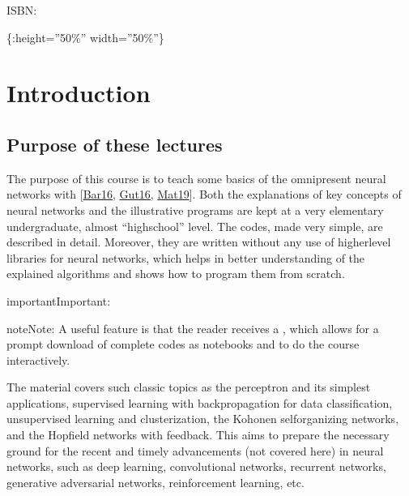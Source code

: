 \documentclass[letterpaper,10pt,english]{jupyterBook}
\begin{document}
\sphinxAtStartPar
ISBN: 

\sphinxAtStartPar
{}\{:height=”50\%” width=”50\%”\}




\chapter{Introduction}
\label{\detokenize{docs/intro:introduction}}\label{\detokenize{docs/intro::doc}}

\section{Purpose of these lectures}
\label{\detokenize{docs/intro:purpose-of-these-lectures}}
\sphinxAtStartPar
The purpose of this course is to teach some basics of the omnipresent neural networks with  {[}\hyperlink{cite.docs/conclusion:id5}{Bar16}, \hyperlink{cite.docs/conclusion:id3}{Gut16}, \hyperlink{cite.docs/conclusion:id2}{Mat19}{]}. Both the explanations of key concepts of neural networks and the illustrative programs are kept at a very elementary undergraduate, almost “high\sphinxhyphen{}school” level. The codes, made very simple, are described in detail. Moreover, they are written without any use of higher\sphinxhyphen{}level libraries for neural networks, which helps in better understanding of the explained algorithms and shows how to program them from scratch.

\begin{sphinxadmonition}{important}{Important:}
\sphinxAtStartPar
{}
\end{sphinxadmonition}

\begin{sphinxadmonition}{note}{Note:}
\sphinxAtStartPar
A useful feature is that the reader receives a , which allows for
a prompt download of complete codes as
 notebooks and to do the course interactively.
\end{sphinxadmonition}

\sphinxAtStartPar
The material covers such classic topics as the perceptron and its simplest applications, supervised learning with back\sphinxhyphen{}propagation for data classification, unsupervised learning and clusterization, the Kohonen self\sphinxhyphen{}organizing networks, and the Hopfield networks with feedback. This aims to prepare the necessary ground for the recent and timely advancements (not covered here) in neural networks, such as deep learning, convolutional networks, recurrent networks, generative adversarial networks, reinforcement learning, etc.
\end{document}
